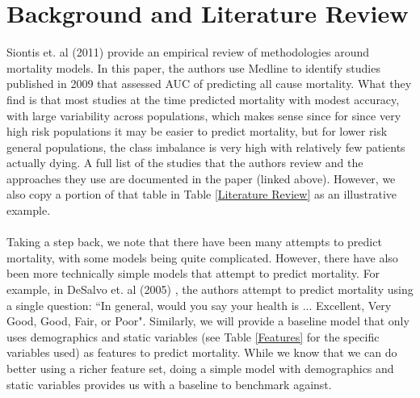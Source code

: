 \documentclass[12pt, final]{article}
\begin{document}
\section{Background and Literature Review}
\label{Background and Lit Review}
Siontis et. al (2011) \cite{Siontis} provide an empirical review of methodologies around mortality models. In this paper, the authors use Medline to identify studies published in 2009 that assessed AUC of predicting all cause mortality. What they find is that most studies at the time predicted mortality with modest accuracy, with large variability across populations, which makes sense since for since very high risk populations it may be easier to predict mortality, but for lower risk general populations, the class imbalance is very high with relatively few patients actually dying. A full list of the studies that the authors review and the approaches they use are documented in the paper (linked above). However, we also copy a portion of that table in Table \ref{Literature Review} as an illustrative example.
\\
\\
Taking a step back, we note that there have been many attempts to predict mortality, with some models being quite complicated. However, there have also been more technically simple models that attempt to predict mortality. For example, in DeSalvo et. al (2005) \cite{DeSalvo}, the authors attempt to predict mortality using a single question: ``In general, would you say your health is ... Excellent, Very Good, Good, Fair, or Poor". Similarly, we will provide a baseline model that only uses demographics and static variables (see Table \ref{Features} for the specific variables used) as features to predict mortality. While we know that we can do better using a richer feature set, doing a simple model with demographics and static variables provides us with a baseline to benchmark against.
\end{document}

